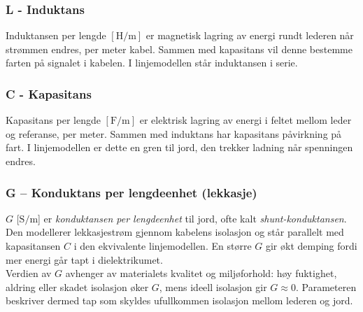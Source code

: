 \subsubsection{L - Induktans}
Induktansen per lengde $[\mathrm{H}/\mathrm{m}]$ er magnetisk lagring av energi rundt lederen når strømmen endres, per meter kabel. Sammen med kapasitans vil denne bestemme farten på signalet i kabelen. I linjemodellen står induktansen i serie.

\subsubsection{C - Kapasitans}
Kapasitans per lengde $[\mathrm{F}/\mathrm{m}]$ er elektrisk lagring av energi i feltet mellom leder og referanse, per meter. Sammen med induktans har kapasitans påvirkning på fart. I linjemodellen er dette en gren til jord, den trekker ladning når spenningen endres.

\subsubsection{G -- Konduktans per lengdeenhet (lekkasje)}
$G$ [$\mathrm{S/m}$] er \textit{konduktansen per lengdeenhet} til jord, ofte kalt 
\textit{shunt-konduktansen}. Den modellerer lekkasjestrøm gjennom kabelens isolasjon og står 
parallelt med kapasitansen $C$ i den ekvivalente linjemodellen. En større $G$ gir økt demping 
fordi mer energi går tapt i dielektrikumet. 
\\[1em]
Verdien av $G$ avhenger av materialets kvalitet og miljøforhold: høy fuktighet, aldring eller 
skadet isolasjon øker $G$, mens ideell isolasjon gir $G \approx 0$. Parameteren beskriver dermed 
tap som skyldes ufullkommen isolasjon mellom lederen og jord.
